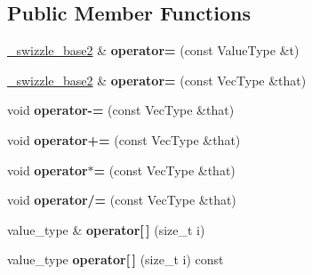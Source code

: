 \subsection*{\-Public \-Member \-Functions}
\begin{DoxyCompactItemize}
\item 
\hypertarget{structglm_1_1detail_1_1__swizzle__base2_a297df83a1e1962477b6834f97b9c6a6a}{\hyperlink{structglm_1_1detail_1_1__swizzle__base2}{\-\_\-swizzle\-\_\-base2} \& {\bfseries operator=} (const \-Value\-Type \&t)}\label{structglm_1_1detail_1_1__swizzle__base2_a297df83a1e1962477b6834f97b9c6a6a}

\item 
\hypertarget{structglm_1_1detail_1_1__swizzle__base2_a231527e1349e677ba7ab2d53742ef242}{\hyperlink{structglm_1_1detail_1_1__swizzle__base2}{\-\_\-swizzle\-\_\-base2} \& {\bfseries operator=} (const \-Vec\-Type \&that)}\label{structglm_1_1detail_1_1__swizzle__base2_a231527e1349e677ba7ab2d53742ef242}

\item 
\hypertarget{structglm_1_1detail_1_1__swizzle__base2_a26e653b4bf831c1171a8999c08f06537}{void {\bfseries operator-\/=} (const \-Vec\-Type \&that)}\label{structglm_1_1detail_1_1__swizzle__base2_a26e653b4bf831c1171a8999c08f06537}

\item 
\hypertarget{structglm_1_1detail_1_1__swizzle__base2_a83c0024bcb9ed27bc290560f3b1968e2}{void {\bfseries operator+=} (const \-Vec\-Type \&that)}\label{structglm_1_1detail_1_1__swizzle__base2_a83c0024bcb9ed27bc290560f3b1968e2}

\item 
\hypertarget{structglm_1_1detail_1_1__swizzle__base2_a8da77c15d444f7bb057285a2c92be01c}{void {\bfseries operator$\ast$=} (const \-Vec\-Type \&that)}\label{structglm_1_1detail_1_1__swizzle__base2_a8da77c15d444f7bb057285a2c92be01c}

\item 
\hypertarget{structglm_1_1detail_1_1__swizzle__base2_acda3b1e53bff334a247408db2896aa89}{void {\bfseries operator/=} (const \-Vec\-Type \&that)}\label{structglm_1_1detail_1_1__swizzle__base2_acda3b1e53bff334a247408db2896aa89}

\item 
\hypertarget{structglm_1_1detail_1_1__swizzle__base2_abd391e719ecd24ee966d974d83965e37}{value\-\_\-type \& {\bfseries operator\mbox{[}$\,$\mbox{]}} (size\-\_\-t i)}\label{structglm_1_1detail_1_1__swizzle__base2_abd391e719ecd24ee966d974d83965e37}

\item 
\hypertarget{structglm_1_1detail_1_1__swizzle__base2_a532fa5f2d8449f72378e7d9f3b5c8de3}{value\-\_\-type {\bfseries operator\mbox{[}$\,$\mbox{]}} (size\-\_\-t i) const }\label{structglm_1_1detail_1_1__swizzle__base2_a532fa5f2d8449f72378e7d9f3b5c8de3}

\end{DoxyCompactItemize}
